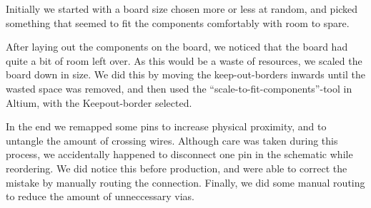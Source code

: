 Initially we started with a board size chosen more or less at random, and picked something that seemed to fit the components comfortably with room to spare.

After laying out the components on the board, we noticed that the board had quite a bit of room left over. As this would be a waste of resources, we scaled the board down in size. We did this by moving the keep-out-borders inwards until the wasted space was removed, and then used the ``scale-to-fit-components''-tool in Altium, with the Keepout-border selected.

In the end we remapped some pins to increase physical proximity, and to untangle the amount of crossing wires. Although care was taken during this process, we accidentally happened to disconnect one pin in the schematic while reordering. We did notice this before production, and were able to correct the mistake by manually routing the connection. Finally, we did some manual routing to reduce the amount of unneccessary vias.

